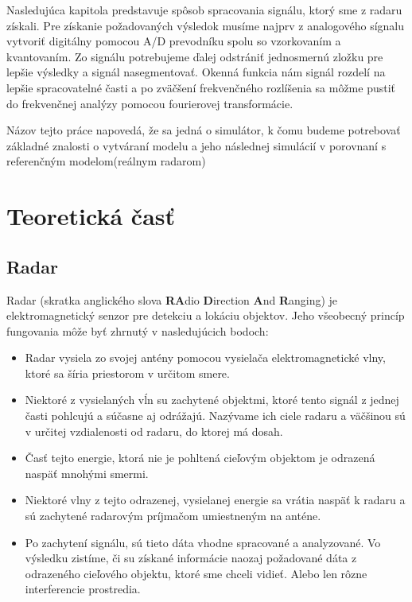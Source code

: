   Nasledujúca kapitola predstavuje spôsob spracovania signálu, ktorý sme z radaru získali. Pre získanie požadovaných výsledok musíme najprv z analogového sígnalu vytvoriť digitálny pomocou A/D prevodníku spolu so vzorkovaním a kvantovaním. Zo signálu potrebujeme ďalej odstrániť jednosmernú zložku pre lepšie výsledky a signál nasegmentovať. Okenná funkcia nám signál rozdelí na lepšie spracovatelné časti a po zväčšení frekvenčného rozlíšenia sa môžme pustiť do frekvenčnej analýzy pomocou fourierovej transformácie.

  Názov tejto práce napovedá, že sa jedná o simulátor, k čomu budeme potrebovať základné znalosti o vytváraní modelu a jeho následnej simulácií v porovnaní s referenčným modelom(reálnym radarom)

\chapter{Teoretická časť}
  \section{Radar}
    \hspace{0.6cm}Radar (skratka anglického slova \textbf{RA}dio \textbf{D}irection \textbf{A}nd \textbf{R}anging) je elektromagnetický senzor pre detekciu a lokáciu objektov. Jeho všeobecný princíp fungovania môže byť zhrnutý v  nasledujúcich bodoch\cite{radartutor}\cite{radarhandbook}:
  \begin{itemize}
  \item Radar vysiela zo svojej antény pomocou vysielača elektromagnetické vlny, ktoré sa šíria priestorom v určitom smere.
  \item Niektoré z vysielaných vĺn su zachytené objektmi, ktoré tento signál z jednej časti pohlcujú a súčasne aj odrážajú. Nazývame ich ciele radaru a väčšinou sú v určitej vzdialenosti od radaru, do ktorej má dosah.
  \item Časť tejto energie, ktorá nie je pohltená cieľovým objektom je odrazená naspäť mnohými smermi.
  \item Niektoré vlny z tejto odrazenej, vysielanej energie sa vrátia naspäť k radaru a sú zachytené radarovým príjmačom umiestneným na anténe.
  \item Po zachytení signálu, sú tieto dáta vhodne spracované a analyzované. Vo výsledku zistíme, či su získané informácie naozaj požadované dáta z odrazeného cieľového objektu, ktoré sme chceli vidieť. Alebo len rôzne interferencie prostredia.
  \end{itemize}

